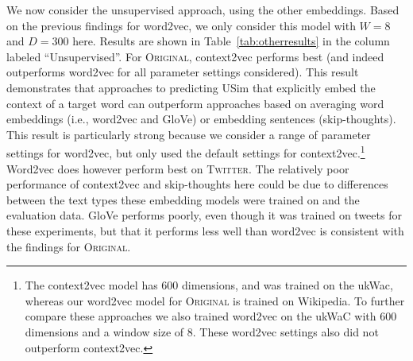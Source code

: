 \documentclass[11pt]{article}
\newcommand\original{\textsc{Original}\xspace}
\newcommand\twitter{\textsc{Twitter}\xspace}
\newcommand\glove{GloVe\xspace}
\newcommand{\secref}[1]{Section~\ref{#1}}
\newcommand{\tabref}[1]{Table~\ref{#1}}
\begin{document}

We now consider the unsupervised approach, using the other
embeddings. Based on the previous findings for word2vec, we only
consider this model with $W=8$ and $D=300$ here. Results are shown in
\tabref{tab:otherresults} in the column labeled ``Unsupervised''. For
\original, context2vec performs best (and indeed outperforms word2vec
for all parameter settings considered). This result demonstrates that
approaches to predicting USim that explicitly embed the context of a
target word can outperform approaches based on averaging word
embeddings (i.e., word2vec and GloVe) or embedding sentences
(skip-thoughts). This result is particularly strong because we
consider a range of parameter settings for word2vec, but only used the
default settings for context2vec.\footnote{The context2vec model has
  600 dimensions, and was trained on the ukWac, whereas our word2vec
  model for \original is trained on Wikipedia. To further compare
  these approaches we also trained word2vec on the ukWaC with 600
  dimensions and a window size of 8. These word2vec settings also did
  not outperform context2vec.}  Word2vec does however perform best on
\twitter.  The relatively poor performance of context2vec and
skip-thoughts here could be due to differences between the text types
these embedding models were trained on and the evaluation data.
\glove performs poorly, even though it was trained on tweets for these
experiments, but that it performs less well than word2vec is
consistent with the findings for \original.
\end{document}
